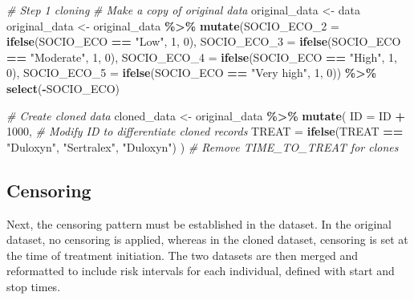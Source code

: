 \documentclass[
]{book}
\newenvironment{Shaded}{\begin{snugshade}}{\end{snugshade}}
\newcommand{\AttributeTok}[1]{\textcolor[rgb]{0.13,0.29,0.53}{#1}}
\newcommand{\CommentTok}[1]{\textcolor[rgb]{0.56,0.35,0.01}{\textit{#1}}}
\newcommand{\DecValTok}[1]{\textcolor[rgb]{0.00,0.00,0.81}{#1}}
\newcommand{\FunctionTok}[1]{\textcolor[rgb]{0.13,0.29,0.53}{\textbf{#1}}}
\newcommand{\NormalTok}[1]{#1}
\newcommand{\OtherTok}[1]{\textcolor[rgb]{0.56,0.35,0.01}{#1}}
\newcommand{\SpecialCharTok}[1]{\textcolor[rgb]{0.81,0.36,0.00}{\textbf{#1}}}
\newcommand{\StringTok}[1]{\textcolor[rgb]{0.31,0.60,0.02}{#1}}
\begin{document}
\begin{Shaded}
\begin{Highlighting}[]
\CommentTok{\# Step 1 cloning}
\CommentTok{\# Make a copy of original data}
\NormalTok{original\_data }\OtherTok{\textless{}{-}}\NormalTok{ data}
\NormalTok{original\_data }\OtherTok{\textless{}{-}}\NormalTok{ original\_data }\SpecialCharTok{\%\textgreater{}\%}
                  \FunctionTok{mutate}\NormalTok{(}\AttributeTok{SOCIO\_ECO\_2 =} \FunctionTok{ifelse}\NormalTok{(SOCIO\_ECO }\SpecialCharTok{==} \StringTok{"Low"}\NormalTok{, }\DecValTok{1}\NormalTok{, }\DecValTok{0}\NormalTok{),}
                         \AttributeTok{SOCIO\_ECO\_3 =} \FunctionTok{ifelse}\NormalTok{(SOCIO\_ECO }\SpecialCharTok{==} \StringTok{"Moderate"}\NormalTok{, }\DecValTok{1}\NormalTok{, }\DecValTok{0}\NormalTok{),}
                         \AttributeTok{SOCIO\_ECO\_4 =} \FunctionTok{ifelse}\NormalTok{(SOCIO\_ECO }\SpecialCharTok{==} \StringTok{"High"}\NormalTok{, }\DecValTok{1}\NormalTok{, }\DecValTok{0}\NormalTok{),}
                         \AttributeTok{SOCIO\_ECO\_5 =} \FunctionTok{ifelse}\NormalTok{(SOCIO\_ECO }\SpecialCharTok{==} \StringTok{"Very high"}\NormalTok{, }\DecValTok{1}\NormalTok{, }\DecValTok{0}\NormalTok{)) }\SpecialCharTok{\%\textgreater{}\%}
  \FunctionTok{select}\NormalTok{(}\SpecialCharTok{{-}}\NormalTok{SOCIO\_ECO)}

\CommentTok{\# Create cloned data}
\NormalTok{cloned\_data }\OtherTok{\textless{}{-}}\NormalTok{ original\_data }\SpecialCharTok{\%\textgreater{}\%}
  \FunctionTok{mutate}\NormalTok{(}
    \AttributeTok{ID =}\NormalTok{ ID }\SpecialCharTok{+} \DecValTok{1000}\NormalTok{,                   }\CommentTok{\# Modify ID to differentiate cloned records}
    \AttributeTok{TREAT =} \FunctionTok{ifelse}\NormalTok{(TREAT }\SpecialCharTok{==} \StringTok{"Duloxyn"}\NormalTok{, }\StringTok{"Sertralex"}\NormalTok{, }\StringTok{"Duloxyn"}\NormalTok{)}
\NormalTok{  )         }\CommentTok{\# Remove TIME\_TO\_TREAT for clones}
\end{Highlighting}
\end{Shaded}

\subsection{Censoring}\label{censoring}

Next, the censoring pattern must be established in the dataset. In the
original dataset, no censoring is applied, whereas in the cloned
dataset, censoring is set at the time of treatment initiation. The two
datasets are then merged and reformatted to include risk intervals for
each individual, defined with start and stop times.
\end{document}
